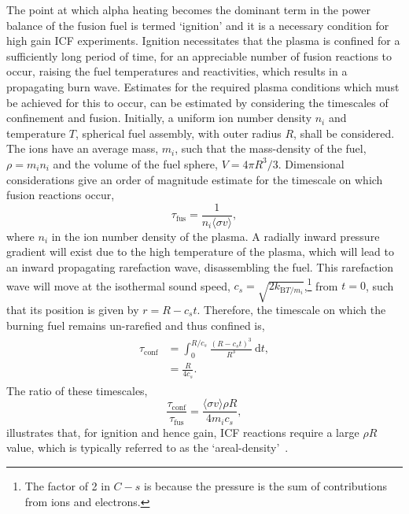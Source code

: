 The point at which alpha heating becomes the dominant term in the power balance of the fusion fuel is termed `ignition' and it is a necessary condition for high gain \ac{ICF} experiments.
Ignition necessitates that the plasma is confined for a sufficiently long period of time, for an appreciable number of fusion reactions to occur, raising the fuel temperatures and reactivities, which results in a propagating burn wave.
Estimates for the required plasma conditions which must be achieved for this to occur, can be estimated by considering the timescales of confinement and fusion.
Initially, a uniform ion number density $n_i$ and temperature $T$, spherical fuel assembly, with outer radius $R$, shall be considered.
The ions have an average mass, $m_i$, such that the mass-density of the fuel, $\rho = m_i n_i$ and the volume of the fuel sphere, $V = 4\pi R^3/3$.
Dimensional considerations give an order of magnitude estimate for the timescale on which fusion reactions occur,
\begin{equation}
    \tau_{\text{fus}} = \frac{1}{n_i \langle \sigma v \rangle},
\end{equation}
where $n_i$ in the ion number density of the plasma.
A radially inward pressure gradient will exist due to the high temperature of the plasma, which will lead to an inward propagating rarefaction wave, disassembling the fuel.
This rarefaction wave will move at the isothermal sound speed, $c_s=\sqrt{2k_{\text{B}T/m_i}}$,\footnote{The factor of 2 in $C-s$ is because the pressure is the sum of contributions from ions and electrons.} from $t=0$, such that its position is given by $r=R-c_s t$.
Therefore, the timescale on which the burning fuel remains un-rarefied and thus confined is,
\begin{align}
    \begin{split}
        \tau_{\text{conf}} &= \int_0^{R/c_s} \frac{ (R - c_s t)^3 }{R^3} \ \text{d}t,\\
        &= \frac{R}{4 c_s}.
    \end{split}
\end{align}
The ratio of these timescales,
\begin{equation}
    \frac{\tau_{\text{conf}}}{\tau_{\text{fus}}} = \frac{\langle \sigma v \rangle \rho R}{4 m_i c_s},
\end{equation}
illustrates that, for ignition and hence gain, \ac{ICF} reactions require a large $\rho R$ value, which is typically referred to as the `areal-density'~\cite{fraley_thermonuclear_1974}.

